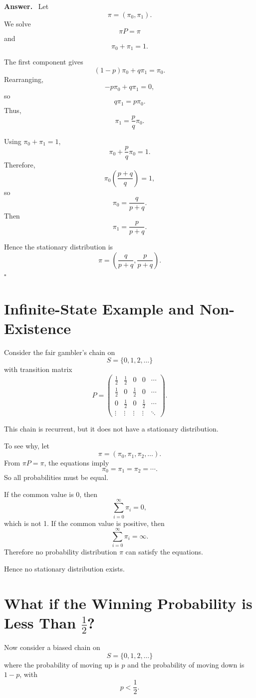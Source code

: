 \documentclass[12pt,a4paper]{article}
\theoremstyle{lecturestyle}
\newenvironment{answer}
{\par\textbf{Answer.}\ }
{\hfill$\square$\par}
\begin{document}
\begin{answer}
Let
\[
\pi=(\pi_0,\pi_1).
\]
We solve
\[
\pi P=\pi
\]
and
\[
\pi_0+\pi_1=1.
\]

The first component gives
\[
(1-p)\pi_0+q\pi_1=\pi_0.
\]
Rearranging,
\[
-p\pi_0+q\pi_1=0,
\]
so
\[
q\pi_1=p\pi_0.
\]
Thus,
\[
\pi_1=\frac{p}{q}\pi_0.
\]

Using $\pi_0+\pi_1=1$,
\[
\pi_0+\frac{p}{q}\pi_0=1.
\]
Therefore,
\[
\pi_0\left(\frac{p+q}{q}\right)=1,
\]
so
\[
\pi_0=\frac{q}{p+q}.
\]
Then
\[
\pi_1=\frac{p}{p+q}.
\]

Hence the stationary distribution is
\[
\boxed{\pi=\left(\frac{q}{p+q},\frac{p}{p+q}\right).}
\]
\end{answer}

\section{Infinite-State Example and Non-Existence}

Consider the fair gambler's chain on
\[
S=\{0,1,2,\ldots\}
\]
with transition matrix
\[
P=
\begin{pmatrix}
\frac12 & \frac12 & 0 & 0 & \cdots\\
\frac12 & 0 & \frac12 & 0 & \cdots\\
0 & \frac12 & 0 & \frac12 & \cdots\\
\vdots & \vdots & \vdots & \vdots & \ddots
\end{pmatrix}.
\]

This chain is recurrent, but it does not have a stationary distribution.

To see why, let
\[
\pi=(\pi_0,\pi_1,\pi_2,\ldots).
\]
From $\pi P=\pi$, the equations imply
\[
\pi_0=\pi_1=\pi_2=\cdots.
\]
So all probabilities must be equal.

If the common value is 0, then
\[
\sum_{i=0}^{\infty}\pi_i=0,
\]
which is not 1. If the common value is positive, then
\[
\sum_{i=0}^{\infty}\pi_i=\infty.
\]
Therefore no probability distribution $\pi$ can satisfy the equations.

Hence no stationary distribution exists.

\section{What if the Winning Probability is Less Than $\frac12$?}

Now consider a biased chain on
\[
S=\{0,1,2,\ldots\}
\]
where the probability of moving up is $p$ and the probability of moving down is $1-p$, with
\[
p<\frac12.
\]
\end{document}
